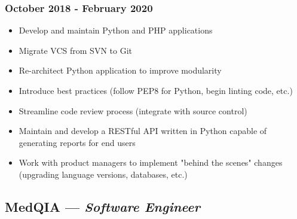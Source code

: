 \documentclass{article}
\begin{document}
\begin{minipage}[t]{.8\textwidth}
\subsubsection*{October 2018 - February 2020}
\parbox[t]{.5\textwidth}{\raggedright%
\begin{itemize}
\vspace{-0.5em}
    \item Develop and maintain Python and PHP applications
    \item Migrate VCS from SVN to Git
    \item Re-architect Python application to improve modularity
    \item Introduce best practices (follow PEP8 for Python, begin linting code, etc.)
\end{itemize}}
\parbox[t]{.5\textwidth}{\raggedright%
\begin{itemize}
\vspace{-1.5em}
    \item Streamline code review process (integrate with source control)
    \item Maintain and develop a RESTful API written in Python capable of generating reports for end users
    \item Work with product managers to implement "behind the scenes" changes (upgrading language versions, databases, etc.)
\end{itemize}}
\vspace{-1.5em}
\subsection*{MedQIA --- \textit{Software Engineer}}

\end{minipage}
\end{document}

